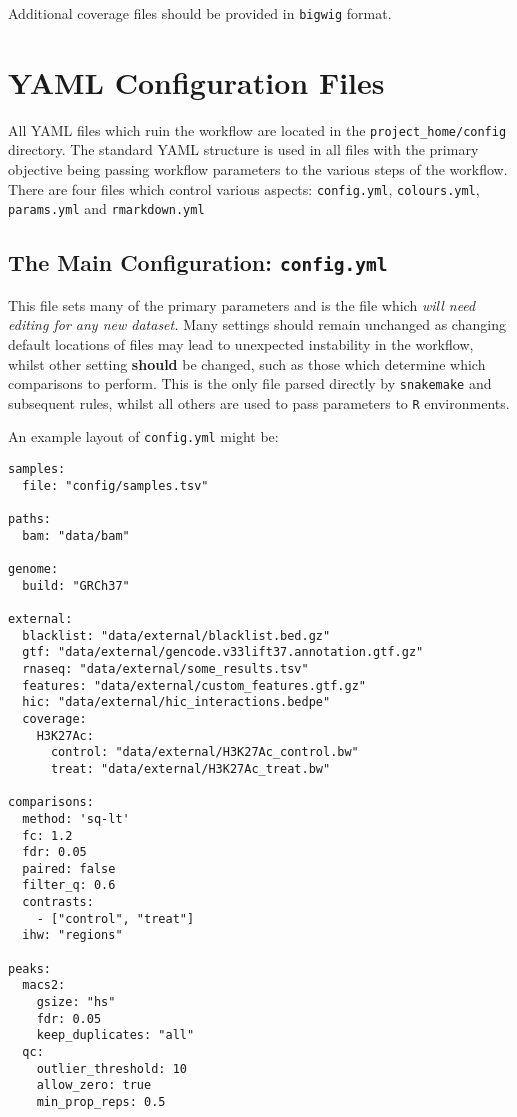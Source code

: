 \documentclass[
]{book}
\begin{document}
Additional coverage files should be provided in \texttt{bigwig} format.

\hypertarget{editing-yaml}{%
\chapter{YAML Configuration Files}\label{editing-yaml}}

All YAML files which ruin the workflow are located in the \texttt{project\_home/config} directory.
The standard YAML structure is used in all files with the primary objective being passing workflow parameters to the various steps of the workflow.
There are four files which control various aspects: \texttt{config.yml}, \texttt{colours.yml}, \texttt{params.yml} and \texttt{rmarkdown.yml}

\hypertarget{config-yml}{%
\section{\texorpdfstring{The Main Configuration: \texttt{config.yml}}{The Main Configuration: config.yml}}\label{config-yml}}

This file sets many of the primary parameters and is the file which \emph{will need editing for any new dataset.}
Many settings should remain unchanged as changing default locations of files may lead to unexpected instability in the workflow, whilst other setting \textbf{should} be changed, such as those which determine which comparisons to perform.
This is the only file parsed directly by \texttt{snakemake} and subsequent rules, whilst all others are used to pass parameters to \texttt{R} environments.

An example layout of \texttt{config.yml} might be:

\begin{verbatim}
samples:
  file: "config/samples.tsv"

paths:
  bam: "data/bam"

genome:
  build: "GRCh37"

external:
  blacklist: "data/external/blacklist.bed.gz"
  gtf: "data/external/gencode.v33lift37.annotation.gtf.gz"
  rnaseq: "data/external/some_results.tsv"
  features: "data/external/custom_features.gtf.gz"
  hic: "data/external/hic_interactions.bedpe"
  coverage:
    H3K27Ac:
      control: "data/external/H3K27Ac_control.bw"
      treat: "data/external/H3K27Ac_treat.bw"

comparisons:
  method: 'sq-lt'
  fc: 1.2
  fdr: 0.05
  paired: false
  filter_q: 0.6
  contrasts:
    - ["control", "treat"]
  ihw: "regions"

peaks:
  macs2:
    gsize: "hs"
    fdr: 0.05
    keep_duplicates: "all"
  qc:
    outlier_threshold: 10
    allow_zero: true
    min_prop_reps: 0.5
\end{verbatim}
\end{document}
